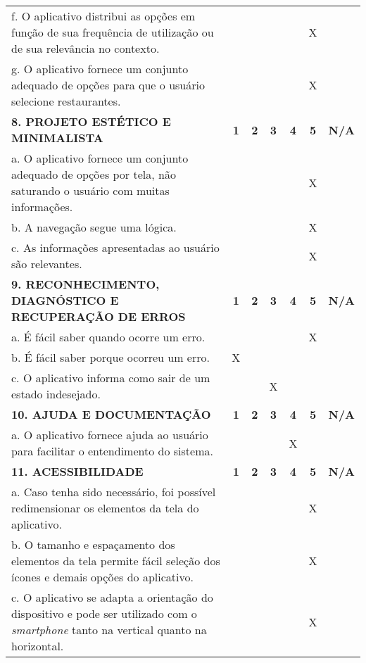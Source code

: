 \documentclass[portuguese,oneside]{tcc}
\begin{document}
\begin{table}[h]
{\begin{tabu}{|L{25em}|c|c|c|c|c|c|}
							f. O aplicativo distribui as opções em função de sua frequência de utilização ou de sua relevância no contexto.	& & & & & X & \\ 
							g. O aplicativo fornece um conjunto adequado de opções para que o usuário selecione restaurantes. & & & & & X & \\ 
							\textbf{8. PROJETO ESTÉTICO E MINIMALISTA} & \textbf{1} & \textbf{2} & \textbf{3} & \textbf{4} & \textbf{5} & \textbf{N/A} \\ 
							a. O aplicativo fornece um conjunto adequado de opções por tela, não saturando o usuário com muitas informações. & & & & & X & \\ 
							b. A navegação segue uma lógica. & & & & & X & \\ 
							c. As informações apresentadas ao usuário são relevantes. & & & & & X & \\ 
							\textbf{9. RECONHECIMENTO, DIAGNÓSTICO E RECUPERAÇÃO DE ERROS} & \textbf{1} & \textbf{2} & \textbf{3} & \textbf{4} & \textbf{5} & \textbf{N/A} \\ 
							a. É fácil saber quando ocorre um erro.	& & & & & X & \\ 
							b. É fácil saber porque ocorreu um erro. & X & & & & & \\ 
							c. O aplicativo informa como sair de um estado indesejado. & & & X & & & \\ 
							\textbf{10. AJUDA E DOCUMENTAÇÃO} & \textbf{1} & \textbf{2} & \textbf{3} & \textbf{4} & \textbf{5} & \textbf{N/A} \\ 
							a. O aplicativo fornece ajuda ao usuário para facilitar o entendimento do sistema. & & & & X & & \\ 
							\textbf{11. ACESSIBILIDADE} & \textbf{1} & \textbf{2} & \textbf{3} & \textbf{4} & \textbf{5} & \textbf{N/A} \\ 
							a. Caso tenha sido necessário, foi possível redimensionar os elementos da tela do aplicativo. & & & & & X & \\ 
							b. O tamanho e espaçamento dos elementos da tela permite fácil seleção dos ícones e demais opções do aplicativo. & & & & & X & \\ 
							c. O aplicativo se adapta a orientação do dispositivo e pode ser utilizado com o \emph{smartphone} tanto na vertical quanto na horizontal. & & & & & X & \\ 

\end{tabu}}
\end{table}
\end{document}
